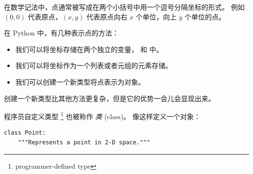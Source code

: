 
在数学记法中，点通常被写成在两个小括号中用一个逗号分隔坐标的形式。
例如 $(0,0)$ 代表原点，$(x,y)$ 代表原点向右 $x$ 个单位，向上 $y$ 个单位的点。


在 Python 中，有几种表示点的方法：

\begin{itemize}


\item 我们可以将坐标存储在两个独立的变量， 和  中。


\item 我们可以将坐标作为一个列表或者元组的元素存储。


\item 我们可以创建一个新类型将点表示为对象。

\end{itemize}


创建一个新类型比其他方法更复杂，但是它的优势一会儿会显现出来。


程序员自定义类型 \footnote{programmer-defined type} 也被称作 {\em 类} (class)。  像这样定义一个对象：

  
  

\begin{lstlisting}
class Point:
    """Represents a point in 2-D space."""
\end{lstlisting}

